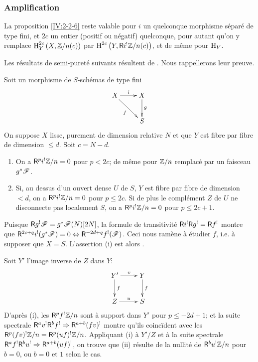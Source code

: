 \subsubsection{Amplification}\label{IV:2-2-7}

La proposition \ref{IV:2-2-6} reste valable pour $i$ un quelconque morphisme 
s\'epar\'e de type fini, et $2 c$ un entier (positif ou n\'egatif) quelconque, 
pour autant qu'on y remplace $\operatorname{H}_Y^{2 c}\left(X,\mathbb{Z}/n(c)\right)$ par 
$\operatorname{H}^{2 c}\left(Y,\mathsf{R} i^!\mathbb{Z}/n(c)\right)$, et de m\^eme pour $\operatorname{H}_V$. 

Les r\'esultats de semi-puret\'e suivants r\'esultent de 
\cite[1.8, 1.10, 1.15]{sga2}. Nous rappellerons leur preuve. 





\begin{theorem}\label{IV:2-2-8}
Soit un morphisme de $S$-sch\'emas de type fini 
\[\xymatrix{
  X \ar[r]^-i \ar[dr]_-f 
    & X \ar[d]^-g \\
  & S
}\]
On suppose $X$ lisse, purement de dimension relative $N$ et que $Y$ est fibre 
par fibre de dimension $\leqslant d$. Soit $c=N-d$. 
\begin{enumerate}[\indent (i)]
  \item On a $\mathsf{R}^p i^!\mathbb{Z}/n=0$ pour $p<2 c$; de m\^eme pour $\mathbb{Z}/n$ remplac\'e 
    par un faisceau $g^* \mathscr{F}$.
  \item Si, au dessus d'un ouvert dense $U$ de $S$, $Y$ est fibre par fibre de 
    dimension $<d$, on a $\mathsf{R}^p i^!\mathbb{Z}/n=0$ pour $p\leqslant 2 c$. Si de plus le 
    compl\'ement $Z$ de $U$ ne disconnecte pas localement $S$, on a 
    $\mathsf{R}^pi^!\mathbb{Z}/n=0$ pour $p\leqslant 2 c+1$.
\end{enumerate}
\end{theorem}

Puisque $\mathsf{R} g^! \mathscr{F}=g^*\mathscr{F}(N)[2N]$, la formule de transitivit\'e 
$\mathsf{R} i^!\mathsf{R} g^!=\mathsf{R} f^!$ montre que 
$\mathsf{R}^{2 c+q} i^!(g^*\mathscr{F})=0\Leftrightarrow \mathsf{R}^{-2 d+q}f^!(\mathscr{F})$. Ceci nous 
ram\`ene \`a \'etudier $f$, i.e. \`a supposer que $X=S$. L'assertion (i) est 
alors \cite[XVIII 3.17]{sga4}. 

Soit $Y'$ l'image inverse de $Z$ dans $Y$:
\[\xymatrix{
  Y' \ar[r]^-v \ar[d]^-f 
    & Y \ar[d]^-f \\
  Z \ar[r]^-u 
    & S
}\]
D'apr\`es (i), les $\mathsf{R}^p f^! \mathbb{Z}/n$ sont \`a support dans $Y'$ pour 
$p\leqslant -2 d+1$; et la suite spectrale 
$\mathsf{R}^a v^!\mathsf{R}^b f^! \Rightarrow \mathsf{R}^{a+b} (f v)^!$ montre qu'ils coinc\"ident avec 
les $\mathsf{R}^p(f v)^!\mathbb{Z}/n=\mathsf{R}^p(u f)^!\mathbb{Z}/n$. Appliquant (i) \`a $Y'/Z$ et \`a la 
suite spectrale $\mathsf{R}^a f^!\mathsf{R}^b u^! \Rightarrow \mathsf{R}^{a+b} (u f)^!$, on trouve que 
(ii) r\'esulte de la nullit\'e de $\mathsf{R}^b u^! \mathbb{Z}/n$ pour $b=0$, ou $b=0$ et $1$ 
selon le cas. 





